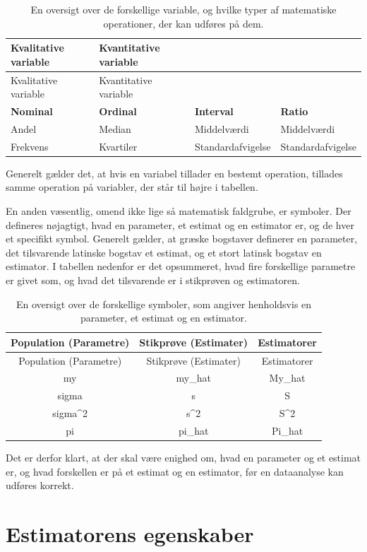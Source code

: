\documentclass[]{book}
\theoremstyle{definition}
\theoremstyle{definition}
\theoremstyle{definition}
\theoremstyle{remark}
\begin{document}
\begin{longtable}[]{@{}llll@{}}
\caption{En oversigt over de forskellige variable, og hvilke typer af matematiske operationer, der kan udføres på dem.}\tabularnewline
\toprule
Kvalitative variable & Kvantitative variable & &\tabularnewline
\midrule
\endfirsthead
\toprule
Kvalitative variable & Kvantitative variable & &\tabularnewline
\midrule
\endhead
\textbf{Nominal} & \textbf{Ordinal} & \textbf{Interval} & \textbf{Ratio}\tabularnewline
Andel & Median & Middelværdi & Middelværdi\tabularnewline
Frekvens & Kvartiler & Standardafvigelse & Standardafvigelse\tabularnewline
\bottomrule
\end{longtable}

Generelt gælder det, at hvis en variabel tillader en bestemt operation, tillades samme operation på variabler, der står til højre i tabellen.

En anden væsentlig, omend ikke lige så matematisk faldgrube, er symboler. Der defineres nøjagtigt, hvad en parameter, et estimat og en estimator er, og de hver et specifikt symbol. Generelt gælder, at græske bogstaver definerer en parameter, det tilsvarende latinske bogstav et estimat, og et stort latinsk bogstav en estimator. I tabellen nedenfor er det opsummeret, hvad fire forskellige parametre er givet som, og hvad det tilsvarende er i stikprøven og estimatoren.

\begin{longtable}[]{@{}ccc@{}}
\caption{En oversigt over de forskellige symboler, som angiver henholdsvis en parameter, et estimat og en estimator.}\tabularnewline
\toprule
Population (Parametre) & Stikprøve (Estimater) & Estimatorer\tabularnewline
\midrule
\endfirsthead
\toprule
Population (Parametre) & Stikprøve (Estimater) & Estimatorer\tabularnewline
\midrule
\endhead
my & my\_hat & My\_hat\tabularnewline
sigma & s & S\tabularnewline
sigma\^{}2 & s\^{}2 & S\^{}2\tabularnewline
pi & pi\_hat & Pi\_hat\tabularnewline
\bottomrule
\end{longtable}

Det er derfor klart, at der skal være enighed om, hvad en parameter og et estimat er, og hvad forskellen er på et estimat og en estimator, før en dataanalyse kan udføres korrekt.

\hypertarget{estimatorens-egenskaber}{%
\section{Estimatorens egenskaber}\label{estimatorens-egenskaber}}
\end{document}
